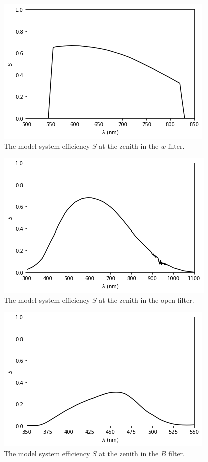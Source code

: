 \begin{figure}
\begin{center}
\includegraphics[width=0.7\linewidth]{figures/huitzi-S-w.png}
\medskip
\caption{The model system efficiency $S$ at the zenith in the $w$ filter.}
\end{center}
\end{figure}

\begin{figure}
\begin{center}
\includegraphics[width=0.7\linewidth]{figures/huitzi-S-open.png}
\medskip
\caption{The model system efficiency $S$ at the zenith in the open filter.}
\end{center}
\end{figure}

\begin{figure}
\begin{center}
\includegraphics[width=0.7\linewidth]{figures/huitzi-S-JC-B.png}
\medskip
\caption{The model system efficiency $S$ at the zenith in the $B$ filter.}
\end{center}
\end{figure}

